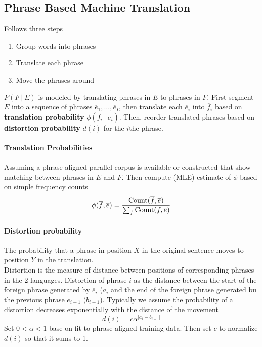\documentclass[10pt]{report}
\begin{document}
\subsection{Phrase Based Machine Translation}
Follows three steps
\begin{enumerate}
	\item Group words into phrases
	\item Translate each phrase
	\item Move the phrases around
\end{enumerate}
$P(F\:|\:E)$ is modeled by translating phrases in $E$ to phrases in $F$. First segment $E$ into a sequence of phrases $\overline{e}_1,\ldots,\overline{e}_I$, then translate each $\overline{e}_i$ into $\overline{f}_i$ based on \textbf{translation probability} $\phi(\overline{f}_i\:|\:\overline{e}_i)$. Then, reorder translated phrases based on \textbf{distortion probability} $d(i)$ for the $i$the phrase.
\paragraph{Translation Probabilities} Assuming a phrase aligned parallel corpus is available or constructed that show matching between phrases in $E$ and $F$. Then compute (MLE) estimate of $\phi$ based on simple frequency counts $$\phi(\overline{f},\overline{e})=\frac{\hbox{Count}(\overline{f},\overline{e})}{\sum_{f} \hbox{Count}(f,\overline{e})}$$
\paragraph{Distortion probability} The probability that a phrase in position $X$ in the original sentence moves to position $Y$ in the translation.\\
Distortion is the measure of distance between positions of corresponding phrases in the 2 languages. Distortion of phrase $i$ as the distance between the start of the foreign phrase generated by $\overline{e}_i$ ($a_i$ and the end of the foreign phrase generated bu the previous phrase $\overline{e}_{i-1}$ ($b_{i-1}$). Typically we assume the probability of a distortion decreases exponentially with the distance of the movement $$d(i) = c\alpha^{|a_i-b_{i-1}|}$$
Set $0<\alpha<1$ base on fit to phrase-aligned training data. Then set $c$ to normalize $d(i)$ so that it sums to 1.
\end{document}
